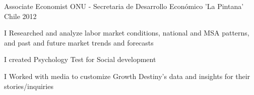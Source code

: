 \begin{cventries}
    \cventry
    {Associate Economist}%
    {ONU - Secretaria de Desarrollo Económico 'La Pintana'} %
    {Chile} %
    {2012} %
    {
    \begin{cvitems} 
     \item { I Researched and analyze labor market conditions, national and MSA patterns, and past and future market trends and forecasts}
      \item {I created Psychology Test for Social development }
       \item {I Worked with media to customize Growth Destiny’s data and insights for their stories/inquiries}
       \end{cvitems}
    }

\end{cventries}
